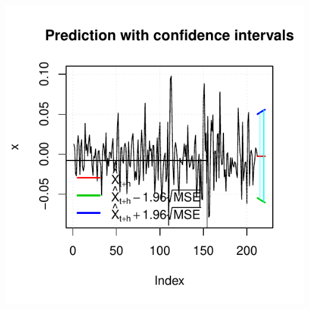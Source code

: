 \documentclass[10pt]{article}\usepackage[]{graphicx}\usepackage[]{color}
\makeatletter
\def\maxwidth{ %
  \ifdim\Gin@nat@width>\linewidth
    \linewidth
  \else
    \Gin@nat@width
  \fi
}
\newenvironment{knitrout}{}{} %
\makeatother
\begin{document}
\begin{knitrout}
{\centering \includegraphics[width=\maxwidth]{figure/unnamed-chunk-92} 

}



\end{knitrout}
\end{document}
